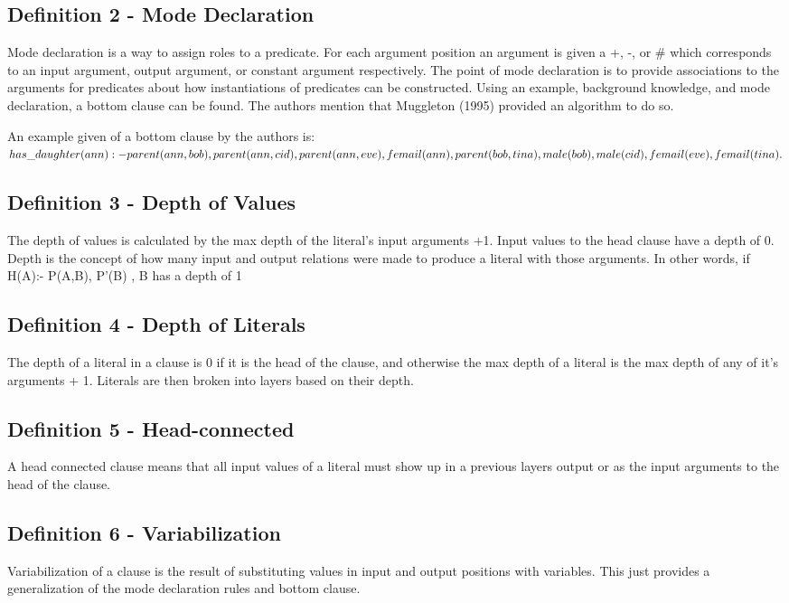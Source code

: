 \documentclass[jair,twoside,11pt,theapa]{article}
\begin{document}
\subsection{Definition 2 - Mode Declaration}
Mode declaration is a way to assign roles to a predicate. For each argument position an argument is given a +, -, or \# which corresponds to an input argument, output argument, or constant argument respectively. The point of mode declaration is to provide associations to the arguments for predicates about how instantiations of predicates can be constructed. Using an example, background knowledge, and mode declaration, a bottom clause can be found. The authors mention that Muggleton (1995) provided an algorithm to do so. 

An example given of a bottom clause by the authors is: \\
$has\_daughter(ann) :- parent(ann, bob), parent(ann, cid), parent(ann, eve), \\
femail(ann), parent(bob, tina), male(bob), male(cid), femail(eve), femail(tina).$ 

\subsection{Definition 3 - Depth of Values}
The depth of values is calculated by the max depth of the literal's input arguments +1. Input values to the head clause have a depth of 0. Depth is the concept of how many input and output relations were made to produce a literal with those arguments. In other words, if H(A):- P(A,B), P'(B) , B has a depth of 1

\subsection{Definition 4 - Depth of Literals}
The depth of a literal in a clause is 0 if it is the head of the clause, and otherwise the max depth of a literal is the max depth of any of it's arguments + 1. Literals are then broken into layers based on their depth. 

\subsection{Definition 5 - Head-connected}
A head connected clause means that all input values of a literal must show up in a previous layers output or as the input arguments to the head of the clause. 

\subsection{Definition 6 - Variabilization}
Variabilization of a clause is the result of substituting values in input and output positions with variables. This just provides a generalization of the mode declaration rules and bottom clause. 
\end{document}

